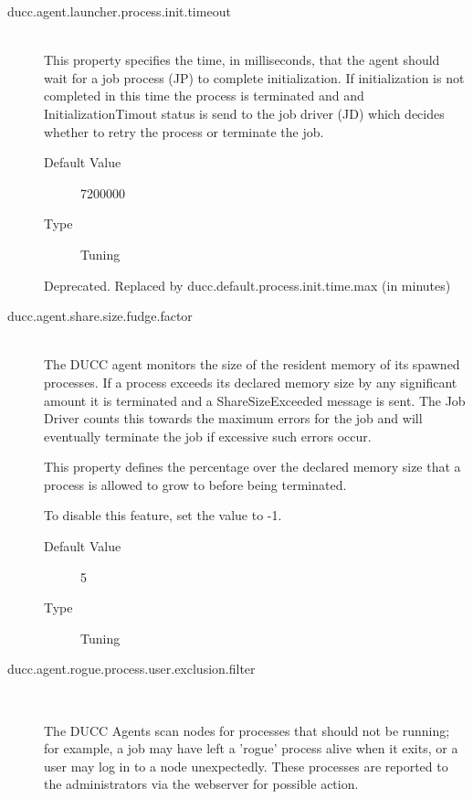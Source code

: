 \begin{description}
        \item[ducc.agent.launcher.process.init.timeout] \hfill \\
          This property specifies the time, in milliseconds, that the agent should wait for a job 
          process (JP) to complete initialization. If initialization is not completed in this time the 
          process is terminated and and InitializationTimout status is send to the job driver (JD) 
          which decides whether to retry the process or terminate the job. 

          \begin{description}
          \item[Default Value] 7200000 
          \item[Type] Tuning 
          \end{description}
          Deprecated. Replaced by ducc.default.process.init.time.max (in minutes)
          

        \item[ducc.agent.share.size.fudge.factor] \hfill \\

          The DUCC agent monitors the size of the resident memory of its spawned processes. If a 
          process exceeds its declared memory size by any significant amount it is terminated and 
          a ShareSizeExceeded message is sent. The Job Driver counts this towards the maximum 
          errors for the job and will eventually terminate the job if excessive such errors occur. 

          This property defines the percentage over the declared memory size that a process is 
          allowed to grow to before being terminated. 

          To disable this feature, set the value to -1. 
          \begin{description}
            \item[Default Value] 5 
            \item[Type] Tuning 
          \end{description}
          
          \item[ducc.agent.rogue.process.user.exclusion.filter] \hfill \\
          \label{itm:props-rogue.user}

            The DUCC Agents scan nodes for processes that should not be running; for example, 
            a job may have left a 'rogue' process alive when it exits, or a user may log in to a node 
            unexpectedly. These processes are reported to the administrators via the webserver for 
            possible action. 


\end{description}
